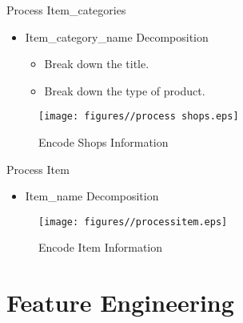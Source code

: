\documentclass[
size=14pt,
paper=smartboard,  %
mode=present, 		%
display=slides, 	%
style=tuliplab,  	%
pauseslide,
fleqn,leqno]{powerdot}
\begin{document}
	
	\begin{slide}{Process Item\_categories}
		\begin{itemize}
			\item
			Item\_category\_name Decomposition
			\begin{itemize}
				\item
				\smallskip
				Break down the title. 
				\item
				\smallskip
				Break down the type of product.
			\end{itemize}
		\end{itemize}
		
		\begin{figure}
			\centering
			\texttt{[image: figures//process shops.eps]}
			\caption{Encode Shops Information}\label{fig:timg}
		\end{figure}
	\end{slide}
	
	
	\begin{slide}{Process Item}
		
		\begin{itemize}
			\item
			Item\_name Decomposition
		\end{itemize}
		
		\begin{figure}
			\centering
			\texttt{[image: figures//processitem.eps]}
			\caption{Encode Item Information}\label{fig:timg}
		\end{figure}
		
	\end{slide}
	
	\section{Feature Engineering}
	
\end{document}
